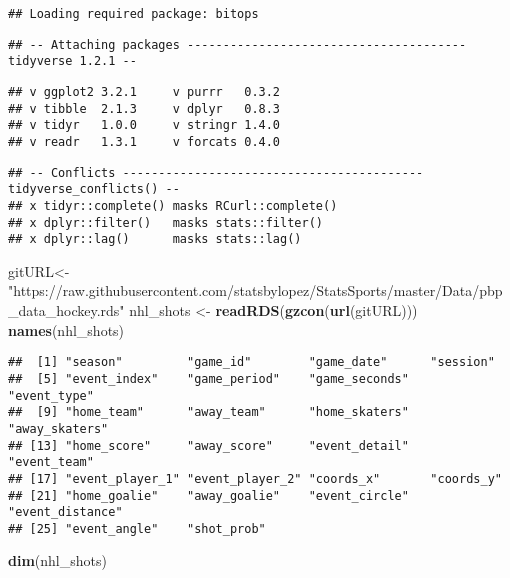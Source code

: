 \documentclass[]{article}
\newenvironment{Shaded}{\begin{snugshade}}{\end{snugshade}}
\newcommand{\KeywordTok}[1]{\textcolor[rgb]{0.13,0.29,0.53}{\textbf{#1}}}
\newcommand{\NormalTok}[1]{#1}
\newcommand{\StringTok}[1]{\textcolor[rgb]{0.31,0.60,0.02}{#1}}
\begin{document}
\begin{verbatim}
## Loading required package: bitops
\end{verbatim}

\begin{verbatim}
## -- Attaching packages --------------------------------------- tidyverse 1.2.1 --
\end{verbatim}

\begin{verbatim}
## v ggplot2 3.2.1     v purrr   0.3.2
## v tibble  2.1.3     v dplyr   0.8.3
## v tidyr   1.0.0     v stringr 1.4.0
## v readr   1.3.1     v forcats 0.4.0
\end{verbatim}

\begin{verbatim}
## -- Conflicts ------------------------------------------ tidyverse_conflicts() --
## x tidyr::complete() masks RCurl::complete()
## x dplyr::filter()   masks stats::filter()
## x dplyr::lag()      masks stats::lag()
\end{verbatim}

\begin{Shaded}
\begin{Highlighting}[]
\NormalTok{gitURL<-}\StringTok{ "https://raw.githubusercontent.com/statsbylopez/StatsSports/master/Data/pbp_data_hockey.rds"}
\NormalTok{nhl_shots <-}\StringTok{ }\KeywordTok{readRDS}\NormalTok{(}\KeywordTok{gzcon}\NormalTok{(}\KeywordTok{url}\NormalTok{(gitURL)))}
\KeywordTok{names}\NormalTok{(nhl_shots)}
\end{Highlighting}
\end{Shaded}

\begin{verbatim}
##  [1] "season"         "game_id"        "game_date"      "session"       
##  [5] "event_index"    "game_period"    "game_seconds"   "event_type"    
##  [9] "home_team"      "away_team"      "home_skaters"   "away_skaters"  
## [13] "home_score"     "away_score"     "event_detail"   "event_team"    
## [17] "event_player_1" "event_player_2" "coords_x"       "coords_y"      
## [21] "home_goalie"    "away_goalie"    "event_circle"   "event_distance"
## [25] "event_angle"    "shot_prob"
\end{verbatim}

\begin{Shaded}
\begin{Highlighting}[]
\KeywordTok{dim}\NormalTok{(nhl_shots)}
\end{Highlighting}
\end{Shaded}
\end{document}
